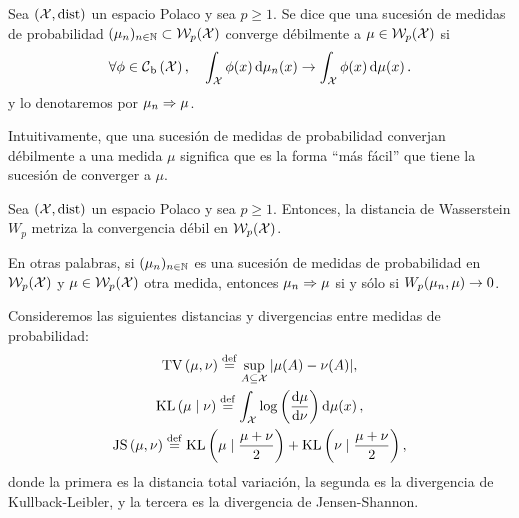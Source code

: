 {{	  \begin{definition}
		  Sea $(\cX, \dist)$ un espacio Polaco y sea $p \geq 1$. Se dice que una sucesión de medidas de probabilidad $(\mu_n)_{n \in \N} \subset \WassersteinSpace[p]{\cX} $ converge débilmente a $\mu \in \WassersteinSpace[p]{\cX}$ si
		  \begin{equation}
			  \forall \phi \in \ContBoundedSpace[\cX], \quad \int_{\cX} \phi(x) \dd{\mu_n(x)} \to \int_{\cX} \phi(x) \dmu[x].
		  \end{equation}
		  y lo denotaremos por $\mu_n \wto \mu$.
	  \end{definition}

	  \begin{note}
		  Intuitivamente, que una sucesión de medidas de probabilidad converjan débilmente a una medida $\mu$ significa que es la forma ``más fácil'' que tiene la sucesión de converger a $\mu$.
	  \end{note}

	  \begin{theorem}
		  Sea $(\cX, \dist)$ un espacio Polaco y sea $p \geq 1$. Entonces, la distancia de Wasserstein $W_p$  metriza la convergencia débil en $\WassersteinSpace[p]{\cX}$.
	  \end{theorem}

	  \begin{remark}
		  En otras palabras, si $(\mu_n)_{n\in\N}$ es una sucesión de medidas de probabilidad en $\WassersteinSpace[p]{\cX}$ y $\mu\in \WassersteinSpace[p]{\cX} $ otra medida, entonces $\mu_n \wto \mu$ si y sólo si $\Wasserstein[p]{\mu_n}{\mu} \to 0$.
	  \end{remark}

	  \begin{example}
		  Consideremos las siguientes distancias y divergencias entre medidas de probabilidad:
		  \begin{gather*}
			  \TV{\mu}{\nu} \eqdef \sup_{A \subseteq \cX} \abs{\mu(A) - \nu(A)}, \\
			  \KL{\mu}{\nu} \eqdef \int_{\cX} \log\left(\dv{\mu}{\nu}(x)\right) \dmu[x], \\
			  \JS{\mu}{\nu} \eqdef \KL{\mu}{\frac{\mu + \nu}{2}} + \KL{\nu}{\frac{\mu + \nu}{2}},
		  \end{gather*}
		  donde la primera es la distancia total variación, la segunda es la divergencia de Kullback-Leibler, y la tercera es la divergencia de Jensen-Shannon.


\end{example}}}
